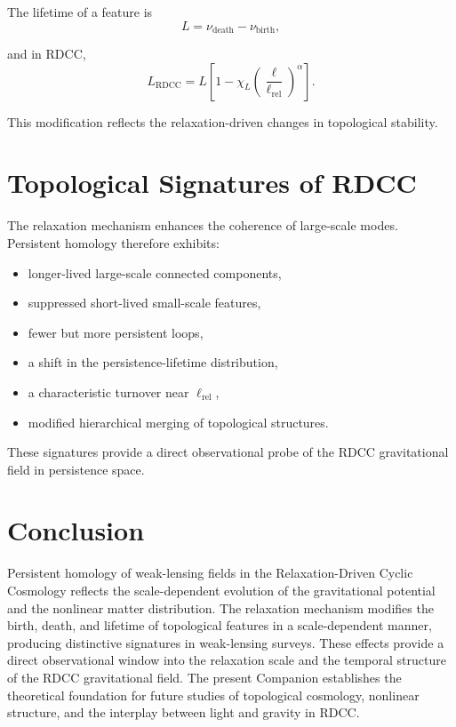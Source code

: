 \documentclass[11pt,a4paper]{article}
\begin{document}
The lifetime of a feature is
\begin{equation}
    L = \nu_{\mathrm{death}} - \nu_{\mathrm{birth}},
\end{equation}

and in RDCC,
\begin{equation}
    L_{\mathrm{RDCC}}
    = L
      \left[
        1 - \chi_{L}
        \left(\frac{\ell}{\ell_{\mathrm{rel}}}\right)^{\alpha}
      \right].
\end{equation}

This modification reflects the relaxation-driven changes in topological stability.
\section{Topological Signatures of RDCC}

The relaxation mechanism enhances the coherence of large-scale modes. Persistent 
homology therefore exhibits:

\begin{itemize}
    \item longer-lived large-scale connected components,
    \item suppressed short-lived small-scale features,
    \item fewer but more persistent loops,
    \item a shift in the persistence-lifetime distribution,
    \item a characteristic turnover near $\ell_{\mathrm{rel}}$,
    \item modified hierarchical merging of topological structures.
\end{itemize}

These signatures provide a direct observational probe of the RDCC gravitational 
field in persistence space.
\section{Conclusion}

Persistent homology of weak-lensing fields in the Relaxation-Driven Cyclic 
Cosmology reflects the scale-dependent evolution of the gravitational potential and 
the nonlinear matter distribution. The relaxation mechanism modifies the birth, 
death, and lifetime of topological features in a scale-dependent manner, producing 
distinctive signatures in weak-lensing surveys. These effects provide a direct 
observational window into the relaxation scale and the temporal structure of the 
RDCC gravitational field. The present Companion establishes the theoretical 
foundation for future studies of topological cosmology, nonlinear structure, and 
the interplay between light and gravity in RDCC.


\nocite{*}

\end{document}
